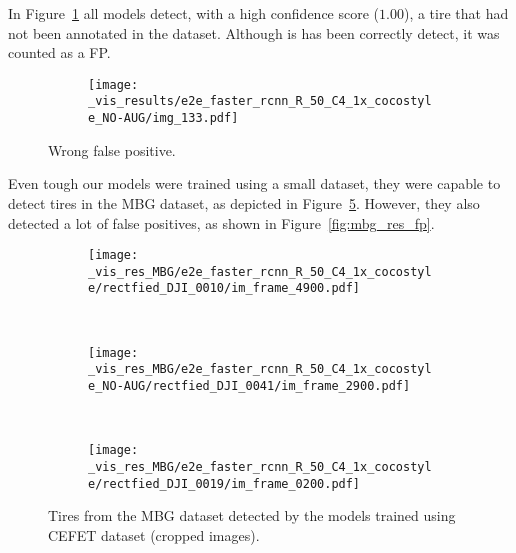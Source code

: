 In Figure~\ref{fig:wrong_fp} all models detect, with a high confidence score ($1.00$), a tire that had not been annotated in the dataset.
Although is has been correctly detect, it was counted as a FP.

\begin{figure}[th!]
  \centering
  \begin{subfigure}[t]{\linewidth}
    \centering
    \texttt{[image: \_vis\_results/e2e\_faster\_rcnn\_R\_50\_C4\_1x\_cocostyle\_NO-AUG/img\_133.pdf]}
  \end{subfigure}%
  \caption{Wrong false positive.}
  \label{fig:wrong_fp}
\end{figure}

Even tough our models were trained using a small dataset, they were capable to detect tires in the MBG dataset, as depicted in Figure~\ref{fig:mbg_res}.
However, they also detected a lot of false positives, as shown in Figure~\ref{fig:mbg_res_fp}.
%
\begin{figure}[th!]
  \centering
  \begin{subfigure}[t]{.33\linewidth}
    \centering
    \texttt{[image: \_vis\_res\_MBG/e2e\_faster\_rcnn\_R\_50\_C4\_1x\_cocostyle/rectfied\_DJI\_0010/im\_frame\_4900.pdf]}
    \label{fig:mbg_res_50N}
  \end{subfigure}~
  \begin{subfigure}[t]{0.33\linewidth}
    \centering
    \texttt{[image: \_vis\_res\_MBG/e2e\_faster\_rcnn\_R\_50\_C4\_1x\_cocostyle\_NO-AUG/rectfied\_DJI\_0041/im\_frame\_2900.pdf]}
    \label{fig:mbg_res_101}
  \end{subfigure}~
  \begin{subfigure}[t]{0.33\linewidth}
    \centering
    \texttt{[image: \_vis\_res\_MBG/e2e\_faster\_rcnn\_R\_50\_C4\_1x\_cocostyle/rectfied\_DJI\_0019/im\_frame\_0200.pdf]}
    \label{fig:mbg_res_50}
  \end{subfigure}
  \caption{Tires from the MBG dataset detected by the models trained using CEFET dataset (cropped images).}
  \label{fig:mbg_res}
\end{figure}



